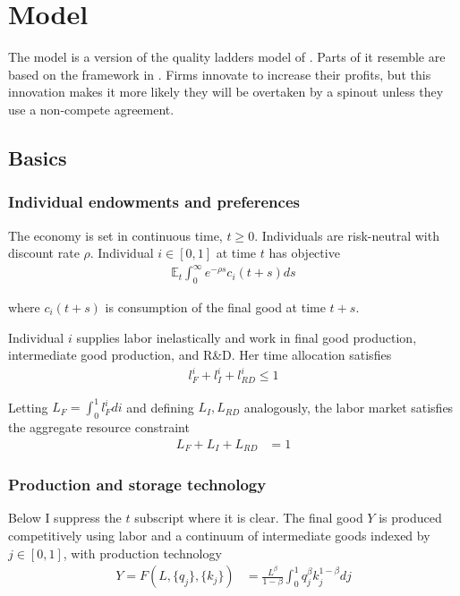 \documentclass[12pt,english]{article}
\theoremstyle{remark}
\begin{document}
\section{Model}

The model is a version of the quality ladders model of \cite{grossman_quality_1991}. Parts of it resemble are based on the framework in \cite{akcigit_growth_2018}. Firms innovate to increase their profits, but this innovation makes it more likely they will be overtaken by a spinout unless they use a non-compete agreement.

\subsection{Basics}

\subsubsection{Individual endowments and preferences}

The economy is set in continuous time, $t \ge 0$. Individuals are risk-neutral with discount rate $\rho$. Individual $i \in [0,1]$ at time $t$ has objective
\begin{align*}
\mathbb{E}_t \int_0^{\infty} e^{-\rho s} c_i(t+s) ds
\end{align*}

where $c_i(t+s)$ is consumption of the final good at time $t+s$.

Individual $i$ supplies labor inelastically and work in final good production, intermediate good production, and R\&D. Her time allocation satisfies
\begin{align*}
l_F^i + l_I^i + l_{RD}^i \le 1
\end{align*}

Letting $L_F = \int_0^1 l_F^i di$ and defining $L_I,L_{RD}$ analogously, the labor market satisfies the aggregate resource constraint
\begin{align}
L_F + L_I + L_{RD} &= 1 \label{labor_resource_constraint}
\end{align}

\subsubsection{Production and storage technology}

Below I suppress the $t$ subscript where it is clear. The final good $Y$ is produced competitively using labor and a continuum of intermediate goods indexed by $j \in [0,1]$, with production technology
\begin{align}
Y = F(L,\{q_j\},\{k_j\}) &= \frac{L^{\beta}}{1-\beta} \int_0^1 q_j^{\beta} k_j^{1-\beta} dj \label{final_goods_production}
\end{align}
\end{document}

